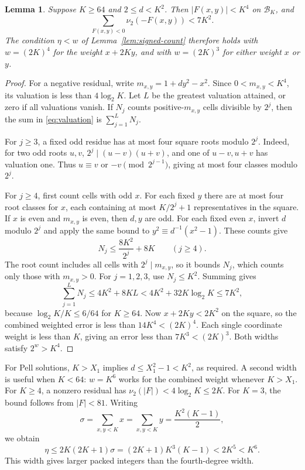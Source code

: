 \documentclass[11pt]{article}
\newtheorem{lemma}[theorem]{Lemma}
\theoremstyle{remark}
\begin{document}
\begin{lemma}\label{lem:valuation}
Suppose $K\ge64$ and $2\le d<K^2$. Then $|F(x,y)|<K^4$ on
$\mathcal B_K$, and
\begin{equation}\label{eq:valuation}
  \sum_{F(x,y)<0}\nu_2(-F(x,y))<7K^2.
\end{equation}
The condition $\eta<w$ of Lemma~\ref{lem:signed-count} therefore holds
with $w=(2K)^4$ for the weight $x+2Ky$, and with $w=(2K)^3$ for
either weight $x$ or $y$.
\end{lemma}

\begin{proof}
For a negative residual, write $m_{x,y}=1+dy^2-x^2$.
Since $0<m_{x,y}<K^4$, its valuation is less than $4\log_2K$.
Let $L$ be the greatest valuation attained, or zero if all valuations
vanish. If $N_j$ counts positive-$m_{x,y}$ cells divisible by $2^j$,
then the sum in \eqref{eq:valuation} is $\sum_{j=1}^L N_j$.

For $j\ge3$, a fixed odd residue has at most four square roots modulo
$2^j$. Indeed, for two odd roots $u,v$,
$2^j\mid(u-v)(u+v)$, and one of $u-v,u+v$ has valuation one.
Thus $u\equiv v$ or $-v\pmod{2^{j-1}}$, giving at most four classes
modulo $2^j$.

For $j\ge4$, first count cells with odd $x$. For each fixed $y$ there
are at most four root classes for $x$, each containing at most
$K/2^j+1$ representatives in the square. If $x$ is even and
$m_{x,y}$ is even, then $d,y$ are odd. For each fixed even $x$,
invert $d$ modulo $2^j$ and apply the same bound to
$y^2\equiv d^{-1}(x^2-1)$. These counts give
\[
  N_j\le\frac{8K^2}{2^j}+8K\qquad(j\ge4).
\]
The root count includes all cells with $2^j\mid m_{x,y}$, so it bounds
$N_j$, which counts only those with $m_{x,y}>0$.
For $j=1,2,3$, use $N_j\le K^2$.
Summing gives
\[
  \sum_{j=1}^L N_j\le4K^2+8KL
  <4K^2+32K\log_2K\le7K^2,
\]
because $\log_2K/K\le6/64$ for $K\ge64$.
Now $x+2Ky<2K^2$ on the square, so the combined weighted error is
less than $14K^4<(2K)^4$. Each single coordinate weight is less than
$K$, giving an error less than $7K^3<(2K)^3$.
Both widths satisfy $2^w>K^4$.
\end{proof}

For Pell solutions, $K>X_1$ implies $d\le X_1^2-1<K^2$, as required.
A second width is useful when $K<64$: $w=K^6$ works for the combined
weight whenever $K>X_1$. For $K\ge4$, a nonzero residual has
$\nu_2(|F|)<4\log_2K\le2K$. For $K=3$, the bound follows from $|F|<81$.
Writing
\begin{equation}\label{eq:sigma}
  \sigma=\sum_{x,y<K}x=\sum_{x,y<K}y=\frac{K^2(K-1)}2,
\end{equation}
we obtain
\[
  \eta\le2K(2K+1)\sigma
  =(2K+1)K^3(K-1)<2K^5<K^6.
\]
This width gives larger packed integers than the fourth-degree width.
\end{document}
